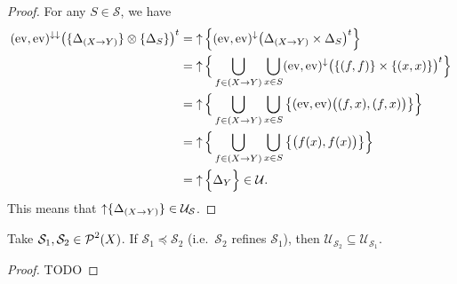 \begin{proof}
For any $S\in \mathcal{S}$, we have
\begin{align*}
(\operatorname{ev}, \operatorname{ev})^{\downarrow\downarrow}\big(\{\Delta_{(X\to Y)}\}\otimes \{\Delta_S\}\big)^t &= \operatorname{\uparrow} \Big\{ (\operatorname{ev}, \operatorname{ev})^{\downarrow}\big(\Delta_{(X\to Y)}\times \Delta_S\big)^t \Big\} \\
&= \operatorname{\uparrow} \Big\{ \bigcup_{f\in (X\to Y)}\bigcup_{x\in S}(\operatorname{ev}, \operatorname{ev})^{\downarrow}\big(\{(f,f)\}\times \{(x,x)\}\big)^t \Big\} \\
&= \operatorname{\uparrow} \Big\{ \bigcup_{f\in (X\to Y)}\bigcup_{x\in S}\big\{(\operatorname{ev}, \operatorname{ev})\big((f,x),(f,x)\big)\big\} \Big\} \\
&= \operatorname{\uparrow} \Big\{ \bigcup_{f\in (X\to Y)}\bigcup_{x\in S}\big\{\big(f(x), f(x)\big)\big\} \Big\} \\
&= \operatorname{\uparrow} \Big\{ \Delta_{Y} \Big\} \in \mathcal{U}.
\end{align*}
This means that $\operatorname{\uparrow} \{\Delta_{(X\to Y)}\} \in \mathcal{U}_\mathcal{S}$.
\end{proof}

\begin{lemma}
Take $\mathcal{S}_1, \mathcal{S}_2 \in\operatorname{\mathcal{P}}^2(X)$. If $\mathcal{S}_1 \preceq \mathcal{S}_2$ (i.e.\ $\mathcal{S}_2$ refines $\mathcal{S}_1$), then $\mathcal{U}_{\mathcal{S}_2} \subseteq \mathcal{U}_{\mathcal{S}_1}$.
\end{lemma}
\begin{proof}
TODO
\end{proof}



